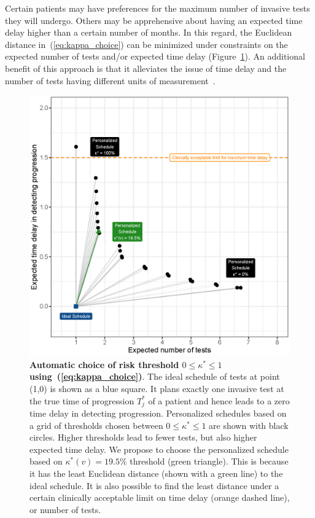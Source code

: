 Certain patients may have preferences for the maximum number of invasive tests they will undergo. Others may be apprehensive about having an expected time delay higher than a certain number of months. In this regard, the Euclidean distance in~(\ref{eq:kappa_choice}) can be minimized under constraints on the expected number of tests and/or expected time delay (Figure~\ref{fig:kappa_choice}). An additional benefit of this approach is that it alleviates the issue of time delay and the number of tests having different units of measurement~\citep{cook1994equivalence}.

\begin{figure}
\centerline{\includegraphics{images/kappa_choice_102.eps}}
\caption{\textbf{Automatic choice of risk threshold $0 \leq \kappa^* \leq 1$ using~(\ref{eq:kappa_choice})}. The ideal schedule of tests at point (1,0) is shown as a blue square. It plans exactly one invasive test at the true time of progression $T^*_j$ of a patient and hence leads to a zero time delay in detecting progression. Personalized schedules based on a grid of thresholds chosen between $0 \leq \kappa^* \leq 1$ are shown with black circles. Higher thresholds lead to fewer tests, but also higher expected time delay. We propose to choose the personalized schedule based on $\kappa^*(v)=19.5\%$ threshold (green triangle). This is because it has the least Euclidean distance (shown with a green line) to the ideal schedule. It is also possible to find the least distance under a certain clinically acceptable limit on time delay (orange dashed line), or number of tests.}
\label{fig:kappa_choice}
\end{figure}